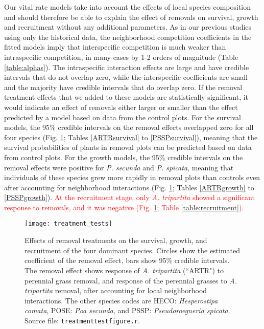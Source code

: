 \documentclass[11pt]{article}
\newcommand{\new}{\textcolor{red}}
\begin{document}
\begin{doublespacing}
Our vital rate models take into account the effects of local species composition and should therefore be able 
to explain the effect of removals on survival, growth and recruitment without any additional parameters. 
As in our previous studies using only the historical data, the neighborhood competition coefficients in the 
fitted models imply that interspecific competition is much weaker than intraspecific competition, in many
cases by 1-2 orders of magnitude (Table \ref{table:alphas}). The intraspecific interaction effects are large and have credible intervals that 
do not overlap zero, while the interspecific coefficients are small and the majority have credible intervals that do overlap zero.
If the removal treatment effects that we added to these models are statistically significant, it would indicate an effect of 
removals either larger or smaller than the effect predicted by a model based on data from the control plots. 
For the survival models, the 95\% credible intervals on the removal effects overlapped zero for all four species (Fig. \ref{fig:VitalRateTest}; 
Tables \ref{ARTRsurvival} to \ref{PSSPsurvival}), meaning that the survival probabilities of plants in removal plots can be predicted based on data 
from control plots. For the growth models, the 95\% credible intervals on the removal effects were positive for \textit{P. secunda}  and \textit{P. spicata},
 meaning that individuals of these species grew more rapidly in removal plots than controls even after accounting for neighborhood interactions 
 (Fig. \ref{fig:VitalRateTest}; Tables \ref{ARTRgrowth} to \ref{PSSPgrowth}). \new{ At the recruitment stage, only \textit{A. tripartita} showed a significant response to removals, and it was negative (Fig. \ref{fig:VitalRateTest}; Table \ref{table:recruitment}).}

 \begin{figure}[tbp]
 \centering
 \texttt{[image: treatment\_tests]}
 \caption{Effects of removal treatments on the survival, growth, and recruitment of the four dominant species. Circles show the estimated coefficient of the removal effect, bars show 95\% credible intervals. The removal effect shows response of \textit{A. tripartita} (``ARTR") to perennial grass removal, and response of the perennial grasses to \textit{A. tripartita} removal, after accounting for local neighborhood interactions. The other species codes are HECO: \textit{Hesperostipa comata}, POSE: \textit{Poa secunda}, and PSSP: \textit{Pseudoroegneria spicata}.
 Source file: \texttt{treatment\textunderscore test\textunderscore figure.r}.}
 \label{fig:VitalRateTest}
 \end{figure}


\end{doublespacing}
\end{document}
